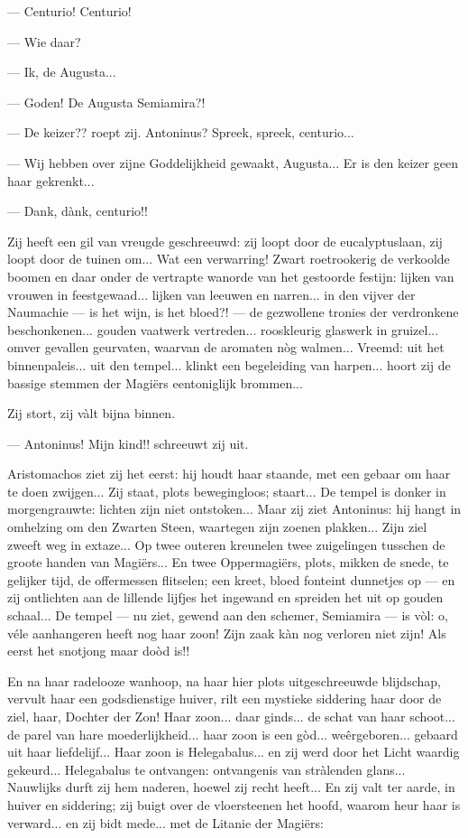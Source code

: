 \documentclass[a4paper, 12pt, oneside, dutch]{article}
\begin{document}
--- Centurio! Centurio!

--- Wie daar?

--- Ik, de Augusta...

--- Goden! De Augusta Semiamira?!

--- De keizer?? roept zij. Antoninus? Spreek, spreek, centurio...

--- Wij hebben over zijne Goddelijkheid gewaakt, Augusta... Er is den keizer geen haar gekrenkt...

--- Dank, dànk, centurio!!

Zij heeft een gil van vreugde geschreeuwd: zij loopt door de eucalyptuslaan, zij loopt door de tuinen om... Wat een verwarring! Zwart roetrookerig de verkoolde boomen en daar onder de vertrapte wanorde van het gestoorde festijn: lijken van vrouwen in feestgewaad... lijken van leeuwen en narren... in den vijver der Naumachie --- is het wijn, is het bloed?! --- de gezwollene tronies der verdronkene beschonkenen... gouden vaatwerk vertreden... rooskleurig glaswerk in gruizel... omver gevallen geurvaten, waarvan de aromaten nòg walmen... Vreemd: uit het binnenpaleis... uit den tempel... klinkt een begeleiding van harpen... hoort zij de bassige stemmen der Magiërs eentoniglijk brommen...

Zij stort, zij vàlt bijna binnen.

--- Antoninus! Mijn kind!! schreeuwt zij uit.

Aristomachos ziet zij het eerst: hij houdt haar staande, met een gebaar om haar te doen zwijgen... Zij staat, plots bewegingloos; staart... De tempel is donker in morgengrauwte: lichten zijn niet ontstoken... Maar zij ziet Antoninus: hij hangt in omhelzing om den Zwarten Steen, waartegen zijn zoenen plakken... Zijn ziel zweeft weg in extaze... Op twee outeren kreunelen twee zuigelingen tusschen de groote handen van Magiërs... En twee Oppermagiërs, plots, mikken de snede, te gelijker tijd, de offermessen flitselen; een kreet, bloed fonteint dunnetjes op --- en zij ontlichten aan de lillende lijfjes het ingewand en spreiden het uit op gouden schaal... De tempel --- nu ziet, gewend aan den schemer, Semiamira --- is vòl: o, véle aanhangeren heeft nog haar zoon! Zijn zaak kàn nog verloren niet zijn! Als eerst het snotjong maar doòd is!!

En na haar radelooze wanhoop, na haar hier plots uitgeschreeuwde blijdschap, vervult haar een godsdienstige huiver, rilt een mystieke siddering haar door de ziel, haar, Dochter der Zon! Haar zoon... daar ginds... de schat van haar schoot... de parel van hare moederlijkheid... haar zoon is een gòd... weêrgeboren... gebaard uit haar liefdelijf... Haar zoon is Helegabalus... en zij werd door het Licht waardig gekeurd... Helegabalus te ontvangen: ontvangenis van stràlenden glans... Nauwlijks durft zij hem naderen, hoewel zij recht heeft... En zij valt ter aarde, in huiver en siddering; zij buigt over de vloersteenen het hoofd, waarom heur haar is verward... en zij bidt mede... met de Litanie der Magiërs:
\end{document}
